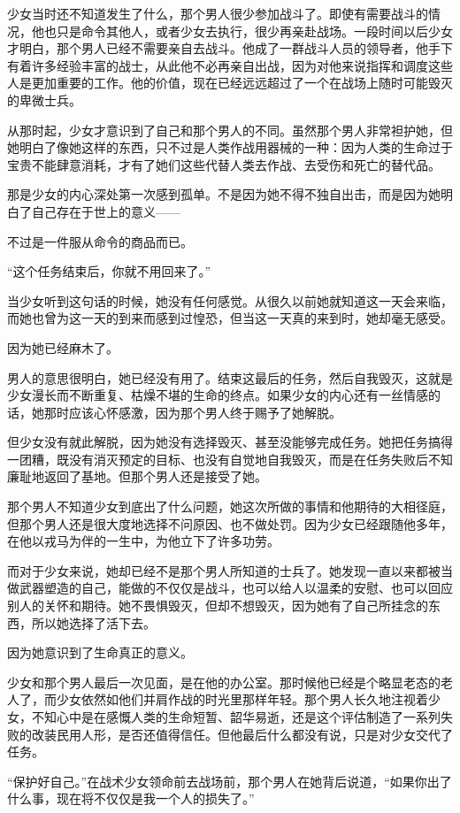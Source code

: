 少女当时还不知道发生了什么，那个男人很少参加战斗了。即使有需要战斗的情况，他也只是命令其他人，或者少女去执行，很少再亲赴战场。一段时间以后少女才明白，那个男人已经不需要亲自去战斗。他成了一群战斗人员的领导者，他手下有着许多经验丰富的战士，从此他不必再亲自出战，因为对他来说指挥和调度这些人是更加重要的工作。他的价值，现在已经远远超过了一个在战场上随时可能毁灭的卑微士兵。

从那时起，少女才意识到了自己和那个男人的不同。虽然那个男人非常袒护她，但她明白了像她这样的东西，只不过是人类作战用器械的一种：因为人类的生命过于宝贵不能肆意消耗，才有了她们这些代替人类去作战、去受伤和死亡的替代品。

那是少女的内心深处第一次感到孤单。不是因为她不得不独自出击，而是因为她明白了自己存在于世上的意义——

不过是一件服从命令的商品而已。

“这个任务结束后，你就不用回来了。”

当少女听到这句话的时候，她没有任何感觉。从很久以前她就知道这一天会来临，而她也曾为这一天的到来而感到过惶恐，但当这一天真的来到时，她却毫无感受。

因为她已经麻木了。

男人的意思很明白，她已经没有用了。结束这最后的任务，然后自我毁灭，这就是少女漫长而不断重复、枯燥不堪的生命的终点。如果少女的内心还有一丝情感的话，她那时应该心怀感激，因为那个男人终于赐予了她解脱。

但少女没有就此解脱，因为她没有选择毁灭、甚至没能够完成任务。她把任务搞得一团糟，既没有消灭预定的目标、也没有自觉地自我毁灭，而是在任务失败后不知廉耻地返回了基地。但那个男人还是接受了她。

那个男人不知道少女到底出了什么问题，她这次所做的事情和他期待的大相径庭，但那个男人还是很大度地选择不问原因、也不做处罚。因为少女已经跟随他多年，在他以戎马为伴的一生中，为他立下了许多功劳。

而对于少女来说，她却已经不是那个男人所知道的士兵了。她发现一直以来都被当做武器塑造的自己，能做的不仅仅是战斗，也可以给人以温柔的安慰、也可以回应别人的关怀和期待。她不畏惧毁灭，但却不想毁灭，因为她有了自己所挂念的东西，所以她选择了活下去。

因为她意识到了生命真正的意义。

少女和那个男人最后一次见面，是在他的办公室。那时候他已经是个略显老态的老人了，而少女依然如他们并肩作战的时光里那样年轻。那个男人长久地注视着少女，不知心中是在感慨人类的生命短暂、韶华易逝，还是这个评估制造了一系列失败的改装民用人形，是否还值得信任。但他最后什么都没有说，只是对少女交代了任务。

“保护好自己。”在战术少女领命前去战场前，那个男人在她背后说道，“如果你出了什么事，现在将不仅仅是我一个人的损失了。”

